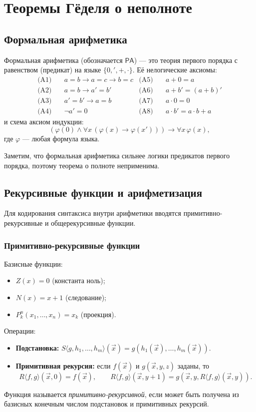 \documentclass[10pt]{article}
\begin{document}
\section{Теоремы Гёделя о неполноте}
\subsection{Формальная арифметика}
Формальная арифметика (обозначается $\mathsf{PA}$) — это теория первого порядка с равенством (предикат) на языке $\{0,',+,\cdot\}$. Её нелогические аксиомы:
\begin{align}
\text{(A1)}&\quad a = b \to a = c \to b = c &\text{(A5)}&\quad a+0 = a\\
\text{(A2)}&\quad a = b \to a' = b' &\text{(A6)}&\quad a+b' = (a+b)'\\
\text{(A3)}&\quad a' = b' \to a = b &\text{(A7)}&\quad a\cdot 0 = 0\\
\text{(A4)}&\quad \neg a' = 0 &\text{(A8)}&\quad a\cdot b' = a\cdot b + a
\end{align}
и схема аксиом индукции:
\[
(\varphi(0) \land \forall x\,(\varphi(x)\to\varphi(x')))\to\forall x\,\varphi(x),
\]
где $\varphi$ — любая формула языка.

Заметим, что формальная арифметика сильнее логики предикатов первого порядка, поэтому теорема о полноте неприменима.

\subsection{Рекурсивные функции и арифметизация}
Для кодирования синтаксиса внутри арифметики вводятся примитивно-рекурсивные и общерекурсивные функции.

\subsubsection{Примитивно-рекурсивные функции}
Базисные функции:
\begin{itemize}
  \item $Z(x)=0$ (константа ноль);
  \item $N(x)=x+1$ (следование);
  \item $P^n_k(x_1,\dots,x_n)=x_k$ (проекция).
\end{itemize}
Операции:
\begin{itemize}
  \item \textbf{Подстановка:} $S\langle g,h_1,\dots,h_m\rangle(\vec{x}) = g(h_1(\vec{x}),\dots,h_m(\vec{x}))$.
  \item \textbf{Примитивная рекурсия:} если $f(\vec{x})$ и $g(\vec{x},y,z)$ заданы, то
  \[
  R\langle f,g\rangle(\vec{x},0)=f(\vec{x}),\qquad R\langle f,g\rangle(\vec{x},y+1)=g(\vec{x},y,R\langle f,g\rangle(\vec{x},y)).
  \]
\end{itemize}
Функция называется \emph{примитивно-рекурсивной}, если может быть получена из базисных конечным числом подстановок и примитивных рекурсий.
\end{document}
